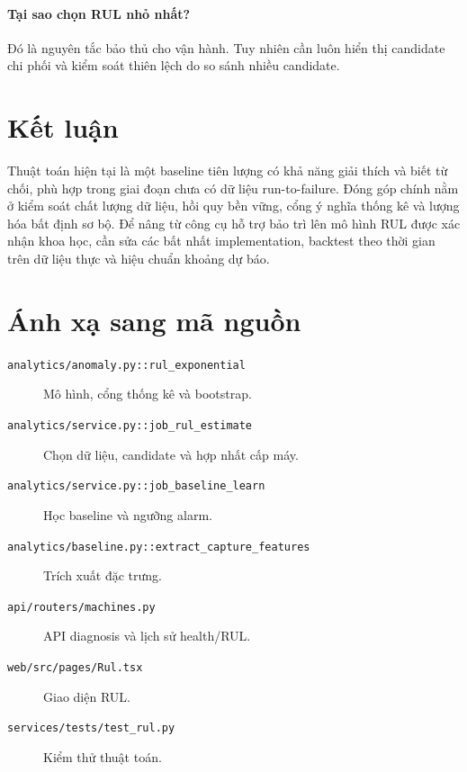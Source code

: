\documentclass[12pt,a4paper]{article}
\newcommand{\code}[1]{\texttt{#1}}
\begin{document}
\paragraph{Tại sao chọn RUL nhỏ nhất?}
Đó là nguyên tắc bảo thủ cho vận hành. Tuy nhiên cần luôn hiển thị candidate chi phối và kiểm soát thiên lệch do so sánh nhiều candidate.

\section{Kết luận}

Thuật toán hiện tại là một baseline tiên lượng có khả năng giải thích và biết từ chối, phù hợp trong giai đoạn chưa có dữ liệu run-to-failure. Đóng góp chính nằm ở kiểm soát chất lượng dữ liệu, hồi quy bền vững, cổng ý nghĩa thống kê và lượng hóa bất định sơ bộ. Để nâng từ công cụ hỗ trợ bảo trì lên mô hình RUL được xác nhận khoa học, cần sửa các bất nhất implementation, backtest theo thời gian trên dữ liệu thực và hiệu chuẩn khoảng dự báo.

\appendix
\section{Ánh xạ sang mã nguồn}

\begin{description}
  \item[\code{analytics/anomaly.py::rul\_exponential}] Mô hình, cổng thống kê và bootstrap.
  \item[\code{analytics/service.py::job\_rul\_estimate}] Chọn dữ liệu, candidate và hợp nhất cấp máy.
  \item[\code{analytics/service.py::job\_baseline\_learn}] Học baseline và ngưỡng alarm.
  \item[\code{analytics/baseline.py::extract\_capture\_features}] Trích xuất đặc trưng.
  \item[\code{api/routers/machines.py}] API diagnosis và lịch sử health/RUL.
  \item[\code{web/src/pages/Rul.tsx}] Giao diện RUL.
  \item[\code{services/tests/test\_rul.py}] Kiểm thử thuật toán.
\end{description}
\end{document}
